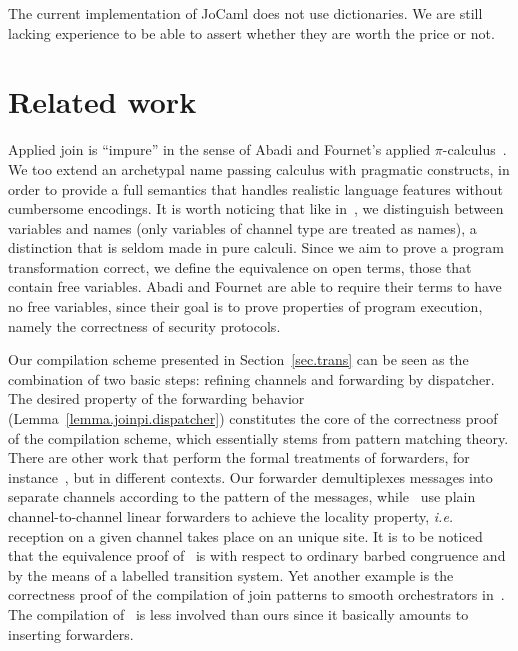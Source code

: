 \documentclass{LMCS}
\makeatletter
\newcommand{\ie}{\emph{i.e.}\@\xspace}
\newcommand{\jocaml}{\textrm{JoCaml}\xspace}
\renewcommand{\_}{\mathord{\rule[-.25ex]{1ex}{.15ex}}}
\makeatother
\begin{document}
The current implementation of \jocaml does not use dictionaries.  We
are still lacking experience to be able to assert whether they are
worth the price or not.

\section{Related work}
\label{sec.relatedwork}

Applied join is ``impure'' in the sense of Abadi and Fournet's
applied $\pi$-calculus~\cite{AppliedPi}. We too extend an archetypal
name passing calculus with pragmatic constructs, in order to provide a
full semantics that handles realistic language features without
cumbersome encodings.  It is worth noticing that like
in~\cite{AppliedPi}, we distinguish between variables and names (only
variables of channel type are treated as names), a distinction that is
seldom made in pure calculi. Since we aim to prove a program
transformation correct, we define the equivalence on open terms, those
that contain free variables. Abadi and Fournet are able to require
their terms to have no free variables, since their goal is to prove
properties of program execution, namely the correctness of security
protocols.

Our compilation scheme presented in Section~\ref{sec.trans} can be
seen as the combination of two basic steps: refining channels and
forwarding by dispatcher. The desired property of the forwarding
behavior (Lemma~\ref{lemma.joinpi.dispatcher}) constitutes the core of
the correctness proof of the compilation scheme, which essentially
stems from pattern matching theory. There are other work that perform
the formal treatments of forwarders, for
instance~\cite{Merro98asynchrony,Gardner2003lf}, but in different
contexts. Our forwarder demultiplexes messages into separate channels
according to the pattern of the messages,
while~\cite{Merro98asynchrony,Gardner2003lf} use plain
channel-to-channel linear forwarders to achieve the locality property,
\ie reception on a given channel takes place on an unique site.
It is to be noticed that the equivalence proof of~\cite{Gardner2003lf}
is with respect to ordinary barbed congruence
and by the means of a labelled transition system.
Yet another example is the correctness proof of the compilation of
join patterns to smooth orchestrators in~\cite{Orchestrators}.
The compilation of~\cite{Orchestrators} is less involved than ours
since it basically amounts to inserting forwarders.
\end{document}
